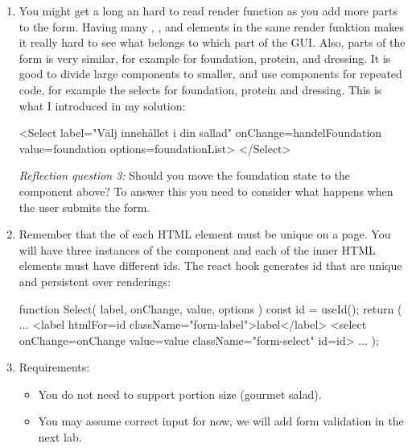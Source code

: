 \documentclass[fleqn, article, a4paper]{memoir}
\begin{document}
\begin{Assignments}
\begin{enumerate}
  \item You might get a long an hard to read render function as you add more parts to the form. Having many , , and  elements in the same render funktion makes it really hard to see what belongs to which part of the GUI. Also, parts of the form is very similar, for example  for foundation, protein, and dressing. It is good to divide large components to smaller, and use components for repeated code, for example the selects for foundation, protein and dressing. This is what I introduced in my solution:
  \begin{Code}
      <Select label="Välj innehållet i din sallad"
        onChange={handelFoundation}
        value={foundation}
        options={foundationList}>
      </Select>
  \end{Code}
  \emph{Reflection question 3:} Should you move the foundation state to the  component above? To answer this you need to consider what happens when the user submits the form.

  \item Remember that the  of each HTML element must be unique on a page. You will have three instances of the  component and each of the inner  HTML elements must have different ids. The react hook  generates id that are unique and persistent over renderings:
\begin{Code}
function Select({ label, onChange, value, options }) {
  const id = useId();
  return (
    ...
    <label htmlFor={id} className="form-label">{label}</label>
    <select onChange={onChange} value={value} className="form-select" id={id}>
  ...
  );
}
\end{Code}


\item Requirements:
\begin{itemize}

  \item You do not need to support portion size (gourmet salad).

  \item You may assume correct input for now, we will add form validation in the next lab.


\end{itemize}
\end{enumerate}
\end{Assignments}
\end{document}
